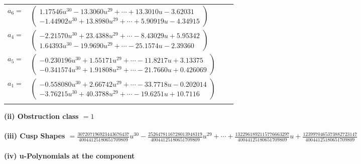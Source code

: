 \documentclass[1p]{elsarticle_modified}
\theoremstyle{definition}
\begin{document}
\begin{tabular}{m{7pt} m{180pt} m{7pt} m{180pt} }
\flushright $a_{6}=$&$\begin{pmatrix}1.17546 u^{30}-13.3060 u^{29}+\cdots+13.3010 u-3.62031\\-1.44902 u^{30}+13.8980 u^{29}+\cdots+5.90919 u-4.34915\end{pmatrix}$ \\
\flushright $a_{4}=$&$\begin{pmatrix}-2.21570 u^{30}+23.4388 u^{29}+\cdots-8.43029 u+5.95342\\1.64393 u^{30}-19.9690 u^{29}+\cdots-25.1574 u-2.39360\end{pmatrix}$ \\
\flushright $a_{5}=$&$\begin{pmatrix}-0.230196 u^{30}+1.55171 u^{29}+\cdots-11.8217 u+3.13375\\-0.341574 u^{30}+1.91808 u^{29}+\cdots-21.7660 u+0.426069\end{pmatrix}$ \\
\flushright $a_{1}=$&$\begin{pmatrix}-0.558080 u^{30}+2.66742 u^{29}+\cdots-33.7718 u-0.202014\\-3.76215 u^{30}+40.3788 u^{29}+\cdots-19.6251 u+10.7116\end{pmatrix}$\\&\end{tabular}
\flushleft \textbf{(ii) Obstruction class $= 1$}\\~\\
\flushleft \textbf{(iii) Cusp Shapes $= \frac{307207196923443676437}{40044125180651709809} u^{30}-\frac{2526478116728013948319}{40044125180651709809} u^{29}+\cdots+\frac{1322961892115776663297}{40044125180651709809} u+\frac{1239970465373882723147}{40044125180651709809}$}\\~\\
\newpage\renewcommand{\arraystretch}{1}
\flushleft \textbf{(iv) u-Polynomials at the component}\newline \\
\end{document}
